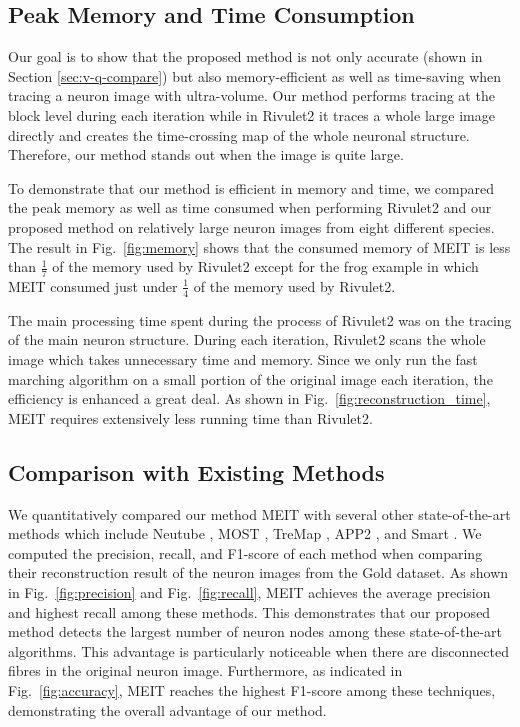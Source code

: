 \documentclass[conference]{IEEEtran}
\begin{document}
\subsection{Peak Memory and Time Consumption}

Our goal is to show that the proposed method is not only accurate (shown in Section \ref{sec:v-q-compare}) but also memory-efficient as well as time-saving when tracing a neuron image with ultra-volume. Our method performs tracing at the block level during each iteration while in Rivulet2 it traces a whole large image directly and creates the time-crossing map of the whole neuronal structure. Therefore, our method stands out when the image is quite large. 

To demonstrate that our method is efficient in memory and time, we compared the peak memory as well as time consumed when performing Rivulet2 \cite{r2} and our proposed method on relatively large neuron images from eight different species. The result in Fig.~\ref{fig:memory} shows that the consumed memory of MEIT is less than $\frac{1}{7}$ of the memory used by Rivulet2 except for the frog example in which MEIT consumed just under $\frac{1}{4}$ of the memory used by Rivulet2. 

The main processing time spent during the process of Rivulet2 was on the tracing of the main neuron structure. During each iteration, Rivulet2 scans the whole image which takes unnecessary time and memory. Since we only run the fast marching algorithm on a small portion of the original image each iteration, the efficiency is enhanced a great deal. As shown in Fig.~\ref{fig:reconstruction_time}, MEIT requires extensively less running time than Rivulet2. 

\subsection{Comparison with Existing Methods}
We quantitatively compared our method MEIT with several other state-of-the-art methods which include Neutube \cite{neutube}, MOST \cite{most}, TreMap \cite{zhou2016tremap}, APP2 \cite{app2}, and Smart \cite{smarttracing}. We computed the precision, recall, and F1-score of each method when comparing their reconstruction result of the neuron images from the Gold dataset. As shown in Fig.~\ref{fig:precision} and Fig.~\ref{fig:recall}, MEIT achieves the average precision and highest recall among these methods. This demonstrates that our proposed method detects the largest number of neuron nodes among these state-of-the-art algorithms. This advantage is particularly noticeable when there are disconnected fibres in the original neuron image. Furthermore, as indicated in Fig.~\ref{fig:accuracy}, MEIT reaches the highest F1-score among these techniques, demonstrating the overall advantage of our method.
\end{document}
